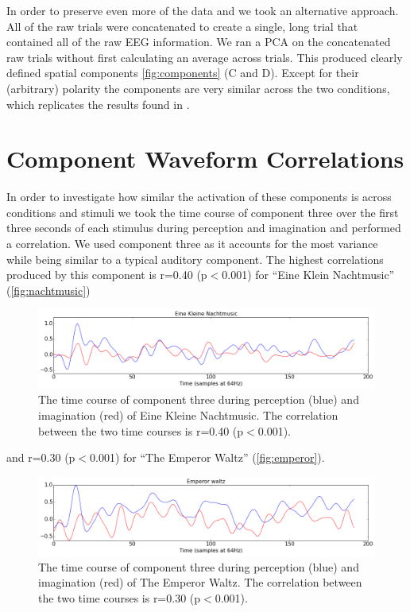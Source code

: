 In order to preserve even more of the data and we took an alternative approach. 
All of the raw trials were concatenated to create a single, long trial that contained all of the raw EEG information.
We ran a \ac{PCA} on the concatenated raw trials without first calculating an average across trials. 
This produced clearly defined spatial components \autoref{fig:components} (C and D).
Except for their (arbitrary) polarity the components are very similar across the two conditions, which replicates the results found in \cite{schaefer_name_2011}.
\newpage
\section{Component Waveform Correlations}
In order to investigate how similar the activation of these components is across conditions and stimuli we took the time course of component three over the first three seconds of each stimulus during perception and imagination and performed a correlation.
We used component three as it accounts for the most variance while being similar to a typical auditory component.
The highest correlations produced by this component is r=0.40 (p$<$0.001) for ``Eine Klein Nachtmusic'' (\autoref{fig:nachtmusic})
\begin{figure}[htbp]
  \centerline{\includegraphics[scale=0.4]{Figures/EineKleineCorrelation}}
  \caption{The time course of component three during perception (blue) and imagination (red) of Eine Kleine Nachtmusic. The correlation between the two time courses is r=0.40 (p$<$0.001).}
  \label{fig:nachtmusic}
\end{figure}
and r=0.30 (p$<$0.001) for ``The Emperor Waltz'' (\autoref{fig:emperor}).
\begin{figure}[htbp]
  \centerline{\includegraphics[scale=0.4]{Figures/EmperorCorrelation}}
  \caption{The time course of component three during perception (blue) and imagination (red) of The Emperor Waltz. The correlation between the two time courses is r=0.30 (p$<$0.001).}
  \label{fig:emperor}
\end{figure}
